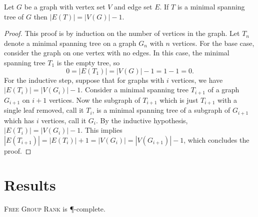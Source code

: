 \documentclass{article}
\newcommand{\FGR}{\textsc{Free Group Rank}}
\begin{document}
\begin{lemma}\label{lem:tree}
  Let $G$ be a graph with vertex set $V$ and edge set $E$.
  If $T$ is a minimal spanning tree of $G$ then $|E(T)| = |V(G)| - 1$.
\end{lemma}
\begin{proof}
  This proof is by induction on the number of vertices in the graph.
  Let $T_n$ denote a minimal spanning tree on a graph $G_n$ with $n$ vertices.
  For the base case, consider the graph on one vertex with no edges.
  In this case, the minimal spanning tree $T_1$ is the empty tree, so
  \begin{equation*}
    0 = |E(T_1)| = |V(G)| - 1 = 1 - 1 = 0.
  \end{equation*}
  For the inductive step, suppose that for graphs with $i$ vertices, we have $|E(T_i)| = |V(G_i)| - 1$.
  Consider a minimal spanning tree $T_{i + 1}$ of a graph $G_{i + 1}$ on $i + 1$ vertices.
  Now the subgraph of $T_{i + 1}$ which is just $T_{i + 1}$ with a single leaf removed, call it $T_i$, is a minimal spanning tree of a subgraph of $G_{i + 1}$ which has $i$ vertices, call it $G_i$.
  By the inductive hypothesis, $|E(T_i)| = |V(G_i)| - 1$.
  This implies $|E(T_{i + 1})| = |E(T_i)| + 1 = |V(G_i)| = |V(G_{i + 1})| - 1$, which concludes the proof.
\end{proof}

\section{Results}

\begin{theorem}
  \FGR{} is \P-complete.
\end{theorem}
\end{document}
